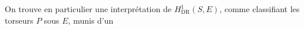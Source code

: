 On trouve en particulier une interprétation de
$H^1_{\mathrm{DR}}(S,E)$, comme classifiant les torseurs $P$ sous $E$,
munis d'un
